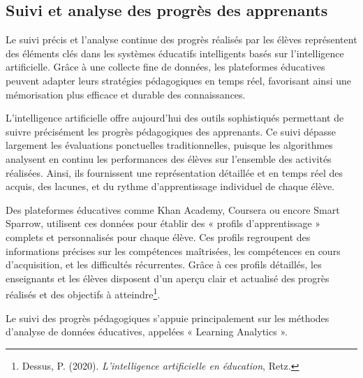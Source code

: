 \documentclass[12pt,a4paper]{report}
\begin{document}
\subsection{Suivi et analyse des progrès des apprenants}

Le suivi précis et l’analyse continue des progrès réalisés par les élèves représentent des éléments clés dans les systèmes éducatifs intelligents basés sur l’intelligence artificielle. Grâce à une collecte fine de données, les plateformes éducatives peuvent adapter leurs stratégies pédagogiques en temps réel, favorisant ainsi une mémorisation plus efficace et durable des connaissances.

L’intelligence artificielle offre aujourd’hui des outils sophistiqués permettant de suivre précisément les progrès pédagogiques des apprenants. Ce suivi dépasse largement les évaluations ponctuelles traditionnelles, puisque les algorithmes analysent en continu les performances des élèves sur l’ensemble des activités réalisées. Ainsi, ils fournissent une représentation détaillée et en temps réel des acquis, des lacunes, et du rythme d’apprentissage individuel de chaque élève.

Des plateformes éducatives comme Khan Academy, Coursera ou encore Smart Sparrow, utilisent ces données pour établir des « profils d’apprentissage » complets et personnalisés pour chaque élève. Ces profils regroupent des informations précises sur les compétences maîtrisées, les compétences en cours d’acquisition, et les difficultés récurrentes. Grâce à ces profils détaillés, les enseignants et les élèves disposent d’un aperçu clair et actualisé des progrès réalisés et des objectifs à atteindre\footnote{Dessus, P. (2020). \textit{L’intelligence artificielle en éducation}, Retz.}.

Le suivi des progrès pédagogiques s’appuie principalement sur les méthodes d’analyse de données éducatives, appelées « Learning Analytics ». 
\end{document}
